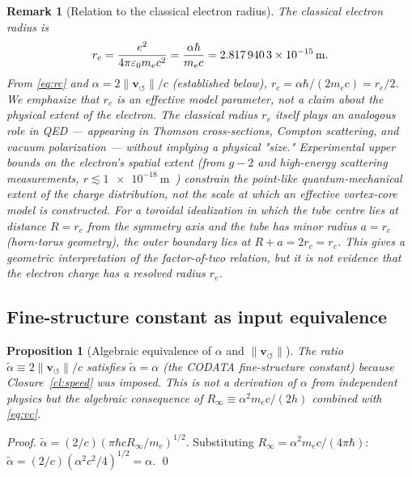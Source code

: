 \documentclass[aps,pra,preprint,longbibliography,nofootinbib]{revtex4-2}
\newtheorem{proposition}{Proposition}
\newtheorem{remark}{Remark}
\newcommand{\vnorm}{\lVert\mathbf{v}_{\!\boldsymbol{\circlearrowleft}}\rVert} %
\newcommand{\rc}{r_c}                            %
\newcommand{\Rinf}{R_\infty}                     %
\begin{document}
\begin{remark}[Relation to the classical electron radius]
\label{rem:re}
The classical electron radius is
\begin{equation}
  r_e = \frac{e^2}{4\pi\varepsilon_0 m_e c^2}
      = \frac{\alpha\hbar}{m_e c}
      = \SI{2.817\,940\,3e-15}{\meter}.
  \label{eq:re}
\end{equation}
From \eqref{eq:rc} and $\alpha = 2\vnorm/c$ (established below),
$\rc = \alpha\hbar/(2m_e c) = r_e/2$.
We emphasize that $\rc$ is an \emph{effective model parameter},
not a claim about the physical extent of the electron.
The classical radius $r_e$ itself plays an analogous role in QED
— appearing in Thomson cross-sections, Compton scattering, and
vacuum polarization — without implying a physical "size."
Experimental upper bounds on the electron's spatial extent
(from $g{-}2$ and high-energy scattering measurements,
$r \lesssim \SI{1e-18}{\meter}$~\cite{PDG2022}) constrain the
\emph{point-like} quantum-mechanical extent of the charge
distribution, not the scale at which an effective vortex-core
model is constructed.
For a toroidal idealization in which the tube centre lies at distance
$R = \rc$ from the symmetry axis and the tube has minor radius
$a = \rc$ (horn-torus geometry), the outer boundary lies at
$R+a=2\rc=r_e$.  This gives a geometric interpretation of the
factor-of-two relation, but it is not evidence that the electron charge
has a resolved radius $r_e$.
\end{remark}

\subsection{Fine-structure constant as input equivalence}
\label{sec:alpha}

\begin{proposition}[Algebraic equivalence of $\alpha$ and $\vnorm$]
\label{prop:alpha}
The ratio $\tilde\alpha \equiv 2\vnorm/c$
satisfies $\tilde\alpha = \alpha$ (the CODATA fine-structure
constant) because Closure~\ref{cl:speed} was imposed.
This is not a derivation of $\alpha$ from independent physics
but the algebraic consequence of $\Rinf \equiv \alpha^2 m_e c/(2h)$
combined with \eqref{eq:vc}.
\end{proposition}

\begin{proof}
$\tilde\alpha = (2/c)(\pi\hbar c\Rinf/m_e)^{1/2}$.
Substituting $\Rinf = \alpha^2 m_e c/(4\pi\hbar)$:
$\tilde\alpha = (2/c)(\alpha^2 c^2/4)^{1/2} = \alpha$. \qed
\end{proof}
\end{document}
